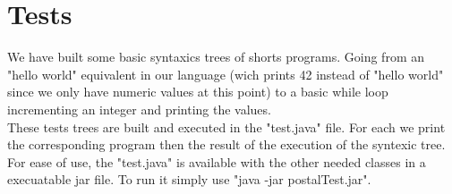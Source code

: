 \documentclass{eplDoc}
\begin{document}
\section{Tests}

We have built some basic syntaxics trees of shorts programs. Going from an "hello world" equivalent in our language (wich prints 42 instead of "hello world" since we only have numeric values at this point) to a basic while loop incrementing an integer and printing the values. \\ 
These tests trees are built and executed in the "test.java" file. For each we print the corresponding program then the result of the execution of the syntexic tree. \\ 
For ease of use, the "test.java" is available with the other needed classes in a execuatable jar file. To run it simply use "java -jar postalTest.jar".
\end{document}
